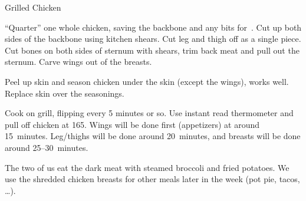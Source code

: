 
\begin{recipe}{Grilled Chicken}
  \maketitle

  ``Quarter'' one whole chicken, saving the backbone and any bits
  for~. Cut up both sides of the backbone using kitchen
  shears. Cut leg and thigh off as a single piece. Cut bones on both sides of sternum
  with shears, trim back meat and pull out the sternum. Carve wings out of the
  breasts.

  Peel up skin and season chicken under the skin (except the wings),
   works well. Replace skin over the seasonings.

  Cook on grill, flipping every 5 minutes or so. Use instant read thermometer and
  pull off chicken at 165\degF. Wings will be done first (appetizers) at around
  15~minutes. Leg/thighs will be done around 20~minutes, and breasts will be done
  around 25--30~minutes.

  The two of us eat the dark meat with steamed broccoli and fried potatoes. We use
  the shredded chicken breasts for other meals later in the week (pot pie, tacos,
  \dots).
\end{recipe}

